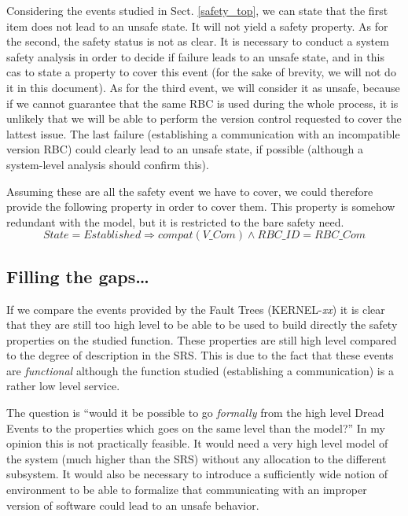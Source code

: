 \documentclass{template/openetcs_article}
\begin{document}
Considering the events studied in Sect. \ref{safety_top}, we can state that the first item does 
not lead to an unsafe state. It will not yield a safety property. As for the second, the safety status 
is not as clear. It is necessary to conduct a system safety analysis in order to decide if failure 
leads to an unsafe state, and in this cas to state a property to cover this event
(for the sake of brevity, we will not do it in this document). As for the third event, we will consider
it as unsafe, because if we cannot guarantee that the same RBC is used during the whole process, it is 
unlikely that we will be able to perform the version control requested to cover the lattest issue.
The last failure (establishing a communication with an incompatible version
RBC) could clearly lead to an unsafe state, if possible (although a system-level analysis should 
confirm this).

Assuming these are all the safety event we have to cover, we could therefore provide the following 
property in order to cover them. This property is somehow redundant with the model, but it is restricted
to the bare safety need.
$$State = Established \Rightarrow compat(V\_Com)\wedge RBC\_ID = RBC\_Com$$

\subsection{Filling the gaps\dots}
\label{gaps}
If we compare the events provided by the Fault Trees (KERNEL-\emph{xx}) it is clear that they are 
still too high level to be able to be used to build directly the safety properties on the studied 
function. These properties are still high level compared to the degree of description in the SRS. This 
is due to the fact that these events are \emph{functional} although the function studied (establishing
a communication) is a rather low level service.

The question is ``would it be possible to go \emph{formally} from the high level Dread Events to 
the properties which goes on the same level than the model?'' In my opinion this is not practically 
feasible. It would need a very high level model of the system (much higher than the SRS) without any 
allocation to the different subsystem. It would also be necessary to introduce a sufficiently wide 
notion of environment to be able to formalize that communicating with an improper version of software 
could lead to an unsafe behavior.
\end{document}
